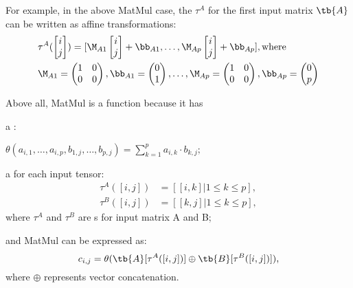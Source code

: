 For example, in the above MatMul case,
the \depmap $\tau^A$ for the first input matrix $\tb{A}$
can be written as affine transformations:
\begin{align*}
    &\tau^{A}(\begin{bmatrix} i \\ j \end{bmatrix}) = [\M_{A1} \begin{bmatrix} i \\ j \end{bmatrix} + \bb_{A1}, \dots, \M_{Ap}\begin{bmatrix} i \\ j \end{bmatrix} + \bb_{Ap} ], \text{where} \\
  &\M_{A1} = \begin{pmatrix}
    1 & 0 \\
    0 & 0
  \end{pmatrix},
  \bb_{A1} = \begin{pmatrix}
    0 \\
    1
  \end{pmatrix}, \dots,
  \M_{Ap} = \begin{pmatrix}
    1 & 0 \\
    0 & 0
  \end{pmatrix},
  \bb_{Ap} = \begin{pmatrix}
    0 \\
    p
  \end{pmatrix}
\end{align*}

Above all,
MatMul is a \simd{} function because it has
\begin{myitemize2}

\item a \kfunc:
    \begin{center}
    $\theta(a_{i,1},\dots, a_{i,p}, b_{1,j}, \dots, b_{p,j}) = \sum_{k=1}^{p} a_{i,k} \cdot b_{k,j};$
    \end{center}

\item a \depmap for each input tensor:
  \begin{align*}
      \tau^{A}([i,j]) &= [[i, k] | 1 \leq k \leq p],\\
      \tau^{B}([i,j]) &= [[k, j] | 1 \leq k \leq p],
  \end{align*}
  where $\tau^A$ and $\tau^B$ are \depmap{}s for input matrix A and B;

\item and MatMul can be expressed as:
\[
    c_{i,j} = \theta(\tb{A}[\tau^A([i,j])] \oplus \tb{B}[\tau^B([i,j])]),
\]
where $\oplus$ represents vector concatenation.

\end{myitemize2}


